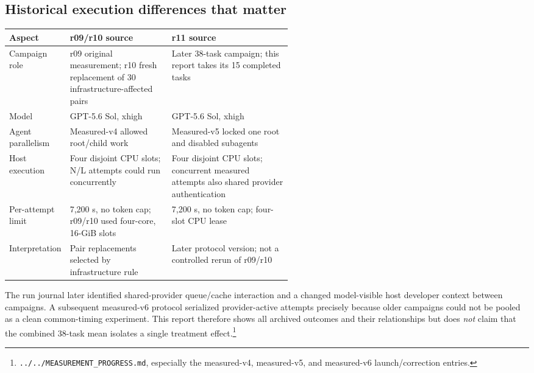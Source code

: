 \documentclass[10pt]{article}
\newcommand{\pathref}[1]{\nolinkurl{#1}}
\begin{document}
\subsection*{Historical execution differences that matter}
\begin{center}\small
\begin{tabularx}{0.98\linewidth}{@{}p{0.18\linewidth}p{0.36\linewidth}X@{}}\toprule
Aspect & r09/r10 source & r11 source \\\midrule
Campaign role & r09 original measurement; r10 fresh replacement of 30 infrastructure-affected pairs & Later 38-task campaign; this report takes its 15 completed tasks \\
Model & GPT-5.6 Sol, xhigh & GPT-5.6 Sol, xhigh \\
Agent parallelism & Measured-v4 allowed root/child work & Measured-v5 locked one root and disabled subagents \\
Host execution & Four disjoint CPU slots; N/L attempts could run concurrently & Four disjoint CPU slots; concurrent measured attempts also shared provider authentication \\
Per-attempt limit & 7,200 s, no token cap; r09/r10 used four-core, 16-GiB slots & 7,200 s, no token cap; four-slot CPU lease \\
Interpretation & Pair replacements selected by infrastructure rule & Later protocol version; not a controlled rerun of r09/r10 \\
\bottomrule\end{tabularx}
\end{center}
The run journal later identified shared-provider queue/cache interaction and a changed model-visible host developer context between campaigns. A subsequent measured-v6 protocol serialized provider-active attempts precisely because older campaigns could not be pooled as a clean common-timing experiment. This report therefore shows all archived outcomes and their relationships but does \emph{not} claim that the combined 38-task mean isolates a single treatment effect.\footnote{\pathref{../../MEASUREMENT_PROGRESS.md}, especially the measured-v4, measured-v5, and measured-v6 launch/correction entries.}

\clearpage
\end{document}
